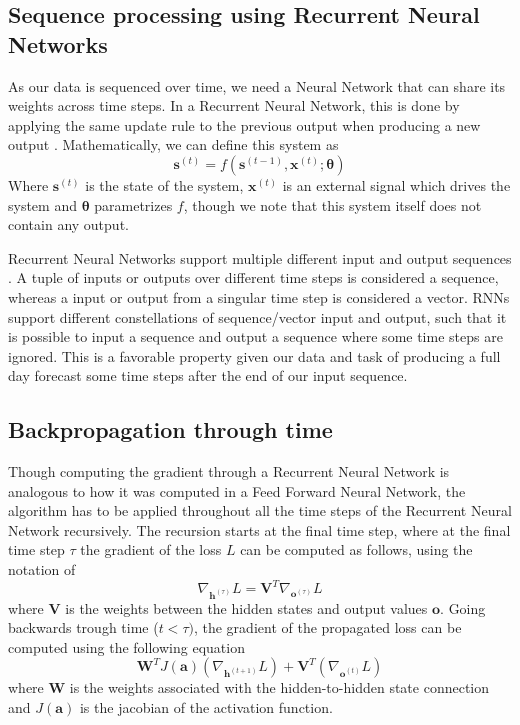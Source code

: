 \documentclass
[twocolumn,
secnumarabic,
nobibnotes,
aps,
prl,
reprint,
groupedaddress,
amsmath,
amssymb,
]{revtex4-2}
\begin{document}
\subsection{Sequence processing using Recurrent Neural Networks}
As our data is sequenced over time, we need a Neural Network that can share its weights across time steps. In a Recurrent Neural Network, this is done by applying the same update rule to the previous output when producing a new output \cite{Goodfellow2016}. Mathematically, we can define this system as
\begin{equation}
  \nonumber
  \bm{s}^{(t)} = f(\bm{s}^{(t-1)},\bm{x}^{(t)};\bm{\theta})
\end{equation}
Where $\bm{s}^{(t)}$ is the state of the system, $\bm{x}^{(t)}$ is an external signal which drives the system and $\bm{\theta}$ parametrizes $f$, though we note that this system itself does not contain any output. 

Recurrent Neural Networks support multiple different input and output sequences \cite{Geron2019}. A tuple of inputs or outputs over different time steps is considered a sequence, whereas a input or output from a singular time step is considered a vector. RNNs support different constellations of sequence/vector input and output, such that it is possible to input a sequence and output a sequence where some time steps are ignored. This is a favorable property given our data and task of producing a full day forecast some time steps after the end of our input sequence.

\subsection{Backpropagation through time}
Though computing the gradient through a Recurrent Neural Network is analogous to how it was computed in a Feed Forward Neural Network, the algorithm has to be applied throughout all the time steps of the Recurrent Neural Network recursively. The recursion starts at the final time step, where at the final time step $\tau$ the gradient of the loss $L$ can be computed as follows, using the notation of \cite{Goodfellow2016}
\begin{equation}
  \nabla_{\bm{h}^{(\tau)}}L = \bm{V}^T \nabla_{\bm{o}^{(\tau)}}L
\end{equation}
where $\bm{V}$ is the weights between the hidden states and output values $\bm{o}$.
Going backwards trough time ($t < \tau)$, the gradient of the propagated loss can be computed using the following equation
\begin{equation}
  \bm{W}^TJ(\bm{a})(\nabla_{\bm{h}^{(t+1)}}L)+\bm{V}^T(\nabla_{\bm{o}^{(t)}}L)
\end{equation}
where $\bm{W}$ is the weights associated with the hidden-to-hidden state connection and $J(\bm{a})$ is the jacobian of the activation function.%
\end{document}
